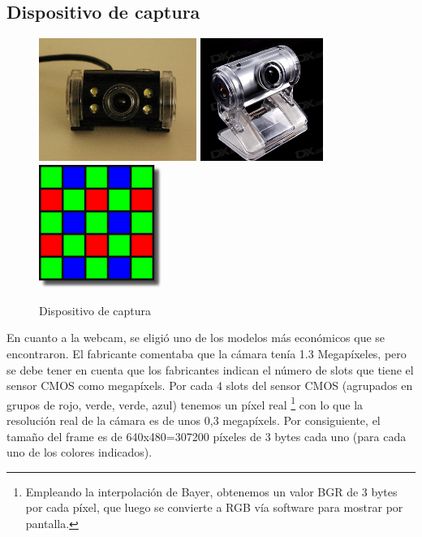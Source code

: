 \subsection{Dispositivo de captura}

\begin{figure}[h!]
        \centering
	\includegraphics[height=4cm]{imagenes/camara_empleada.jpg}
	\includegraphics[height=4cm]{imagenes/camara_actual.jpg}
	\includegraphics[height=4cm]{imagenes/bayer_mosaic.png}
        \caption{Dispositivo de captura}
	\label{fig:webcam}
\end{figure}

En cuanto a la webcam, se eligió uno de los modelos más económicos que se encontraron. El fabricante comentaba que la cámara tenía 1.3 Megapíxeles, pero se debe tener en cuenta que los fabricantes indican el número de slots que tiene el sensor CMOS como megapíxels. Por cada 4 slots del sensor CMOS (agrupados en grupos de rojo, verde, verde, azul) tenemos un píxel real \footnote{Empleando la interpolación de Bayer, obtenemos un valor BGR de 3 bytes por cada píxel, que luego se convierte a RGB vía software para mostrar por pantalla.} con lo que la resolución real de la cámara es de unos 0,3 megapíxels. Por consiguiente, el tamaño del frame es de 640x480=307200 píxeles de 3 bytes cada uno (para cada uno de los colores indicados). 

